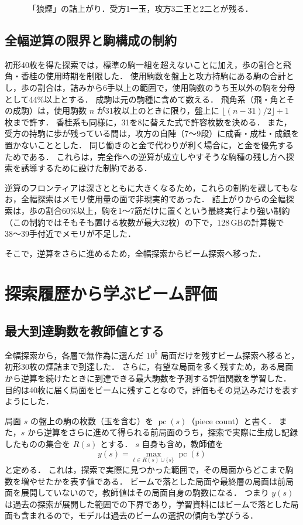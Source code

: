 \documentclass[english,submit]{ipsj}
\newcommand{\pc}{\operatorname{pc}}
\begin{document}
\begin{figure}[t]
\centering

\caption{「狼煙」の詰上がり．受方1一玉，攻方3二王と2二とが残る．}
\label{fig:mate}
\end{figure}

\subsection{全幅逆算の限界と駒構成の制約}
\label{sec:constraints}
初形40枚を得た探索では，標準の駒一組を超えないことに加え，歩の割合と飛角・香桂の使用時期を制限した．
使用駒数を盤上と攻方持駒にある駒の合計とし，歩の割合は，詰みから6手以上の範囲で，使用駒数のうち玉以外の駒を分母として44\%以上とする．
成駒は元の駒種に含めて数える．
飛角系（飛・角とその成駒）は，使用駒数 $n$ が31枚以上のときに限り，盤上に $\lfloor (n-31)/2\rfloor+1$ 枚まで許す．
香桂系も同様に，31を8に替えた式で許容枚数を決める．
また，受方の持駒に歩が残っている間は，攻方の自陣（7〜9段）に成香・成桂・成銀を置かないこととした．
同じ働きのと金で代わりが利く場合に，と金を優先するためである．
これらは，完全作への逆算が成立しやすそうな駒種の残し方へ探索を誘導するために設けた制約である．

逆算のフロンティアは深さとともに大きくなるため，これらの制約を課してもなお，全幅探索はメモリ使用量の面で非現実的であった．
詰上がりからの全幅探索は，歩の割合60\%以上，駒を1〜7筋だけに置くという最終実行より強い制約（この制約ではそもそも置ける枚数が最大32枚）の下で，128\,GBの計算機で38〜39手付近でメモリが不足した．

そこで，逆算をさらに進めるため，全幅探索からビーム探索へ移った．

\section{探索履歴から学ぶビーム評価}
\label{sec:learn}
\subsection{最大到達駒数を教師値とする}
全幅探索から，各層で無作為に選んだ $10^5$ 局面だけを残すビーム探索へ移ると，初形30枚の煙詰まで到達した．
さらに，有望な局面を多く残すため，ある局面から逆算を続けたときに到達できる最大駒数を予測する評価関数を学習した．
目的は40枚に届く局面をビームに残すことなので，評価もその見込みだけを表すようにした．

局面 $s$ の盤上の駒の枚数（玉を含む）を $\pc(s)$（piece count）と書く．
また，$s$ から逆算をさらに進めて得られる前局面のうち，探索で実際に生成し記録したものの集合を $R(s)$ とする．
$s$ 自身も含め，教師値を
\begin{equation}
 y(s)=\max_{t\in R(s)\cup\{s\}}\pc(t)
 \label{eq:target}
\end{equation}
と定める．
これは，探索で実際に見つかった範囲で，その局面からどこまで駒数を増やせたかを表す値である．
ビームで落とした局面や最終層の局面は前局面を展開していないので，教師値はその局面自身の駒数になる．
つまり $y(s)$ は過去の探索が展開した範囲での下界であり，学習資料にはビームで落とした局面も含まれるので，モデルは過去のビームの選択の傾向も学びうる．
\end{document}

